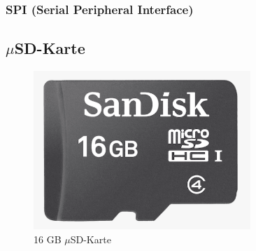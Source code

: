 \subsubsection{SPI (Serial Peripheral Interface)}
\label{subsubsec:spi}
\subsection{$\mu$SD-Karte}
\begin{figure}[h]
\centering
\includegraphics[width=0.2\linewidth]{graphics/Datenspeicherung/micro_sd_card_16GB.png}
\caption{16 GB $\mu$SD-Karte}
\label{fig:muSDKarte}
\end{figure}

